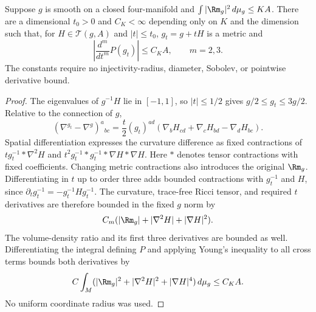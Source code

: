 \begin{lemma}
\label{webvar:variation-remainder}
Suppose $g$ is smooth on a closed four-manifold and
$\int|\Rm_g|^2\,d\mu_g\le K A$.  There are a dimensional $t_0>0$
and $C_K<\infty$ depending only on $K$ and the dimension such that,
for $H\in\mathcal T(g,A)$ and $|t|\le t_0$, $g_t=g+tH$ is a metric
and
\begin{equation}\label{webvar:remainder-bound}
 \left|\frac{d^m}{dt^m}P(g_t)\right|\le C_K A,\qquad m=2,3.
\end{equation}
The constants require no injectivity-radius, diameter, Sobolev,
or pointwise derivative bound.
\end{lemma}
\begin{proof}
The eigenvalues of $g^{-1}H$ lie in $[-1,1]$, so $|t|\le1/2$
gives $g/2\le g_t\le3g/2$.  Relative to the connection of $g$,
\[
 (\nabla^{g_t}-\nabla^g)^a{}_{bc}
 =\frac t2(g_t)^{ad}
       (\nabla_bH_{cd}+\nabla_cH_{bd}-\nabla_dH_{bc}).
\]
Spatial differentiation expresses the curvature difference as fixed
contractions of $t g_t^{-1}*\nabla^2H$ and
$t^2g_t^{-1}*g_t^{-1}*\nabla H*\nabla H$.
Here $*$ denotes tensor contractions with fixed coefficients.
Changing metric contractions also introduces the original $\Rm_g$.
Differentiating in $t$ up to order three adds bounded contractions
with $g_t^{-1}$ and $H$, since
$\partial_tg_t^{-1}=-g_t^{-1}Hg_t^{-1}$.
The curvature, trace-free Ricci tensor, and required $t$ derivatives
are therefore bounded in the fixed $g$ norm by
\[
 C_m(|\Rm_g|+|\nabla^2H|+|\nabla H|^2).
\]
The volume-density ratio and its first three derivatives are bounded
as well.  Differentiating the integral defining $P$ and applying
Young's inequality to all cross terms bounds both derivatives by
\[
 C\int_M(|\Rm_g|^2+|\nabla^2H|^2+|\nabla H|^4)\,d\mu_g\le C_K A.
\]
No uniform coordinate radius was used.
\end{proof}


